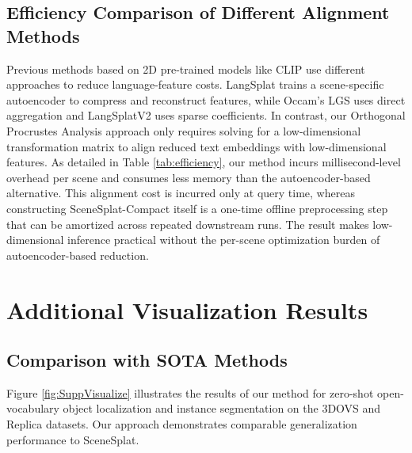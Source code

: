 \subsection{Efficiency Comparison of Different Alignment Methods}
Previous methods based on 2D pre-trained models like CLIP \cite{radford2021learning} use different approaches to reduce language-feature costs. LangSplat \cite{qin2024langsplat} trains a scene-specific autoencoder to compress and reconstruct features, while Occam's LGS \cite{cheng2024occamslgssimpleapproach} uses direct aggregation and LangSplatV2 \cite{li2025langsplatv2} uses sparse coefficients. In contrast, our Orthogonal Procrustes Analysis approach only requires solving for a low-dimensional transformation matrix to align reduced text embeddings with low-dimensional features.
As detailed in Table \ref{tab:efficiency}, our method incurs millisecond-level overhead per scene and consumes less memory than the autoencoder-based alternative. This alignment cost is incurred only at query time, whereas constructing SceneSplat-Compact itself is a one-time offline preprocessing step that can be amortized across repeated downstream runs. The result makes low-dimensional inference practical without the per-scene optimization burden of autoencoder-based reduction.


\section{Additional Visualization Results}
\label{sec:add_vis}

\subsection{Comparison with SOTA Methods}
Figure \ref{fig:SuppVisualize} illustrates the results of our method for zero-shot open-vocabulary object localization and instance segmentation on the 3DOVS\cite{liu2023weakly} and Replica\cite{straub2019replica} datasets. Our approach demonstrates comparable generalization performance to SceneSplat.

